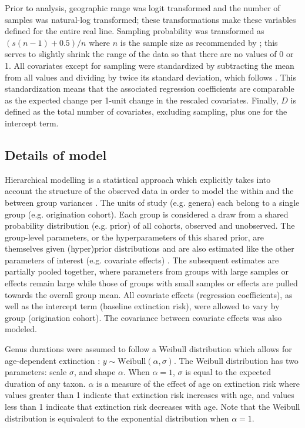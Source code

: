 \documentclass[11pt]{article}
\begin{document}
Prior to analysis, geographic range was logit transformed and the number of samples was natural-log transformed; these transformations make these variables defined for the entire real line. Sampling probability was transformed as \((s (n - 1) + 0.5) / n\) where \(n\) is the sample size as recommended by \citet{Smithson2006}; this serves to slightly shrink the range of the data so that there are no values of 0 or 1. All covariates except for sampling were standardized by subtracting the mean from all values and dividing by twice its standard deviation, which follows \citet{Gelman2007}. This standardization means that the associated regression coefficients are comparable as the expected change per 1-unit change in the rescaled covariates. Finally, \(D\) is defined as the total number of covariates, excluding sampling, plus one for the intercept term.



\subsection*{Details of model}

Hierarchical modelling is a statistical approach which explicitly takes into account the structure of the observed data in order to model the within and the between group variances \citep{Gelman2013d,Gelman2007}. The units of study (e.g. genera) each belong to a single group (e.g. origination cohort). Each group is considered a draw from a shared probability distribution (e.g. prior) of all cohorts, observed and unobserved. The group-level parameters, or the hyperparameters of this shared prior, are themselves given (hyper)prior distributions and are also estimated like the other parameters of interest (e.g. covariate effects) \citep{Gelman2013d}. The subsequent estimates are partially pooled together, where parameters from groups with large samples or effects remain large while those of groups with small samples or effects are pulled towards the overall group mean. All covariate effects (regression coefficients), as well as the intercept term (baseline extinction risk), were allowed to vary by group (origination cohort). The covariance between covariate effects was also modeled. 

Genus durations were assumed to follow a Weibull distribution which allows for age-dependent extinction \citep{Klein2003}: \(y \sim \mathrm{Weibull}(\alpha, \sigma)\). The Weibull distribution has two parameters: scale \(\sigma\), and shape \(\alpha\). When \(\alpha = 1\), \(\sigma\) is equal to the expected duration of any taxon. \(\alpha\) is a measure of the effect of age on extinction risk where values greater than 1 indicate that extinction risk increases with age, and values less than 1 indicate that extinction risk decreases with age. Note that the Weibull distribution is equivalent to the exponential distribution when \(\alpha = 1\). 
\end{document}
